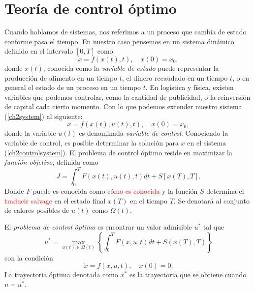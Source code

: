 
\chapter{Teoría de control óptimo}
    
Cuando hablamos de sistemas, nos referimos a un proceso que cambia de estado conforme pasa el tiempo. En nuestro caso pensemos en un sistema dinámico definido en el intervalo $[0, T]$ como
\begin{equation}
    \label{ch2system}
    \dot x =f(x(t),t), \quad x(0) = x_0,  
\end{equation}
donde $x(t)$, conocida como la \textsl{variable de estado} puede representar la producción de alimento en un tiempo $t$, el dinero recaudado en un tiempo $t$, o en general el estado de un proceso en un tiempo $t$. En logística y física, existen variables que podemos controlar, como la cantidad de publicidad, o la reinversión de capital cada cierto momento. Con lo que podemos extender nuestro sistema  (\ref{ch2system}) al siguiente:
\begin{equation}
    \label{ch2controlsystem}
    \dot x = f(x(t),u(t),t), \quad x(0) = x_0,
\end{equation}
donde la variable $u(t)$ es denominada \textsl{variable de control}. Conociendo la variable de control, es posible determinar la solución para $x$ en el sistema (\ref{ch2controlsystem}). El problema de control óptimo reside en maximizar la \textsl{función objetivo}, definida como
\begin{equation}
    J = \int_0^T F(x(t), u(t), t)dt + S[x(T), T].
\end{equation}
Donde $F$ puede es conocida como \textcolor{red}{cómo es conocida} y la función $S$ determina el \textcolor{red}{traducir salvage} en el estado final $x(T)$ en el tiempo $T$. Se denotará al conjunto de calores posibles de $u(t)$ como $\Omega(t)$.

\begin{definition}
    El \textsl{problema de control óptimo} es encontrar un valor admisible $u^*$ tal que 
    \begin{equation}
        \label{ch2umax}
        u^* = \max_{u(t)\in \Omega(t)}\left\{\int_0^T F(x, u, t)dt + S(x(T), T)\right\}
    \end{equation}
    con la condición 
    \begin{equation}
        \label{ch2dynamicCondition}
        \dot x = f(x,u,t), \quad x(0) = 0.
    \end{equation}
    La trayectoria óptima denotada como $x^*$ es la trayectoria que se obtiene cuando $u = u^*$.
\end{definition}


